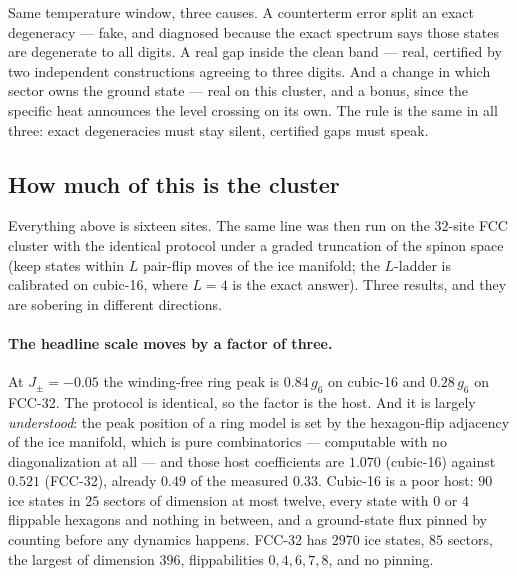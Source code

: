 \documentclass[11pt,a4paper]{article}
\newcommand{\Jpm}{J_{\pm}}
\newcommand{\gsix}{g_6}
\begin{document}
\begin{plainwords}
Same temperature window, three causes.  A counterterm error split an exact
degeneracy --- fake, and diagnosed because the exact spectrum says those
states are degenerate to all digits.  A real gap inside the clean band ---
real, certified by two independent constructions agreeing to three digits.
And a change in which sector owns the ground state --- real on this cluster,
and a bonus, since the specific heat announces the level crossing on its
own.  The rule is the same in all three: exact degeneracies must stay
silent, certified gaps must speak.
\end{plainwords}

\subsection{How much of this is the cluster}
\label{sec:host}

Everything above is sixteen sites.  The same line was then run on the
$32$-site FCC cluster with the identical protocol under a graded truncation
of the spinon space (keep states within $L$ pair-flip moves of the ice
manifold; the $L$-ladder is calibrated on cubic-16, where $L=4$ is the exact
answer).  Three results, and they are sobering in different directions.

\paragraph{The headline scale moves by a factor of three.}  At
$\Jpm=-0.05$ the winding-free ring peak is $0.84\,\gsix$ on cubic-16 and
$0.28\,\gsix$ on FCC-32.  The protocol is identical, so the factor is the
host.  And it is largely \emph{understood}: the peak position of a ring
model is set by the hexagon-flip adjacency of the ice manifold, which is
pure combinatorics --- computable with no diagonalization at all --- and
those host coefficients are $1.070$ (cubic-16) against $0.521$ (FCC-32),
already $0.49$ of the measured $0.33$.  Cubic-16 is a poor host: $90$ ice
states in $25$ sectors of dimension at most twelve, every state with $0$ or
$4$ flippable hexagons and nothing in between, and a ground-state flux
pinned by counting before any dynamics happens.  FCC-32 has $2970$ ice
states, $85$ sectors, the largest of dimension $396$, flippabilities
$0,4,6,7,8$, and no pinning.
\end{document}
